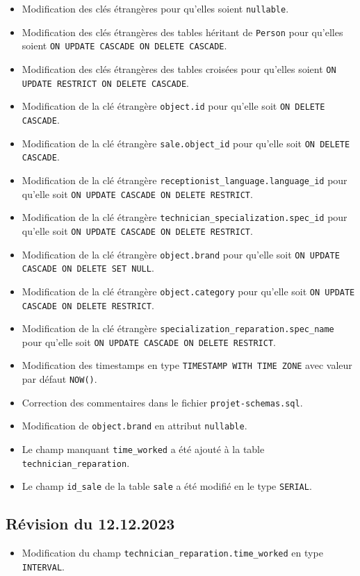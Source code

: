 \documentclass{article}
\newcommand{\ttt}{\texttt}
\begin{document}
\begin{itemize}
    \item Modification des clés étrangères pour qu'elles soient \ttt{nullable}.
    \item Modification des clés étrangères des tables héritant de \ttt{Person} pour qu'elles soient \ttt{ON UPDATE CASCADE ON DELETE CASCADE}.
    \item Modification des clés étrangères des tables croisées pour qu'elles soient \ttt{ON UPDATE RESTRICT ON DELETE CASCADE}.
    \item Modification de la clé étrangère \ttt{object.id} pour qu'elle soit \ttt{ON DELETE CASCADE}.
    \item Modification de la clé étrangère \ttt{sale.object\_id} pour qu'elle soit \ttt{ON DELETE CASCADE}.
    \item Modification de la clé étrangère \ttt{receptionist\_language.language\_id} pour qu'elle soit \ttt{ON UPDATE CASCADE ON DELETE RESTRICT}.
    \item Modification de la clé étrangère \ttt{technician\_specialization.spec\_id} pour qu'elle soit \ttt{ON UPDATE CASCADE ON DELETE RESTRICT}.  
    \item Modification de la clé étrangère \ttt{object.brand} pour qu'elle soit \ttt{ON UPDATE CASCADE ON DELETE SET NULL}.
    \item Modification de la clé étrangère \ttt{object.category} pour qu'elle soit \ttt{ON UPDATE CASCADE ON DELETE RESTRICT}.
    \item Modification de la clé étrangère \ttt{specialization\_reparation.spec\_name} pour qu'elle soit \ttt{ON UPDATE CASCADE ON DELETE RESTRICT}.
    \item Modification des timestamps en type \ttt{TIMESTAMP WITH TIME ZONE} avec valeur par défaut \ttt{NOW()}.
    \item Correction des commentaires dans le fichier \ttt{projet-schemas.sql}.
    \item Modification de \ttt{object.brand} en attribut \ttt{nullable}.
    \item Le champ manquant \ttt{time\_worked} a été ajouté à la table \ttt{technician\_reparation}.
    \item Le champ \ttt{id\_sale} de la table \ttt{sale} a été modifié en le type \ttt{SERIAL}.
\end{itemize}

\subsection*{Révision du 12.12.2023}
\begin{itemize}
    \item Modification du champ \ttt{technician\_reparation.time\_worked} en type \ttt{INTERVAL}.
\end{itemize}
\end{document}
